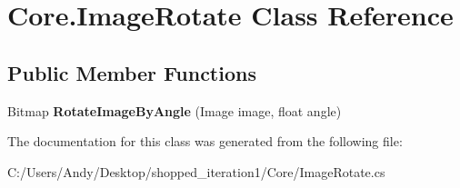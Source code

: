 \hypertarget{class_core_1_1_image_rotate}{
\section{Core.ImageRotate Class Reference}
\label{class_core_1_1_image_rotate}
}
\subsection*{Public Member Functions}
\begin{DoxyCompactItemize}
\item 
\hypertarget{class_core_1_1_image_rotate_afb29109d626ece8b64706820878380b4}{
Bitmap {\bfseries RotateImageByAngle} (Image image, float angle)}
\label{class_core_1_1_image_rotate_afb29109d626ece8b64706820878380b4}

\end{DoxyCompactItemize}


The documentation for this class was generated from the following file:\begin{DoxyCompactItemize}
\item 
C:/Users/Andy/Desktop/shopped\_\-iteration1/Core/ImageRotate.cs\end{DoxyCompactItemize}
